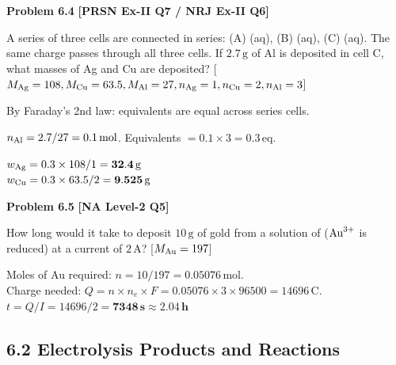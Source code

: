 \begin{problembox}
\textbf{Problem 6.4} \hfill \textbf{[PRSN Ex-II Q7 / NRJ Ex-II Q6]}

A series of three cells are connected in series: (A) (aq), (B) (aq), (C) (aq). The same charge passes through all three cells. If $2.7\,\text{g}$ of Al is deposited in cell C, what masses of Ag and Cu are deposited?
[$M_{\ce{Ag}}=108, M_{\ce{Cu}}=63.5, M_{\ce{Al}}=27, n_{\ce{Ag}}=1, n_{\ce{Cu}}=2, n_{\ce{Al}}=3$]
\end{problembox}
\begin{solution}
By Faraday's 2nd law: equivalents are equal across series cells.

$n_{\ce{Al}} = 2.7/27 = 0.1\,\text{mol}$. Equivalents $= 0.1 \times 3 = 0.3\,\text{eq}$.

$w_{\ce{Ag}} = 0.3 \times 108/1 = \mathbf{32.4\,\text{g}}$\\
$w_{\ce{Cu}} = 0.3 \times 63.5/2 = \mathbf{9.525\,\text{g}}$
\end{solution}

\begin{problembox}
\textbf{Problem 6.5} \hfill \textbf{[NA Level-2 Q5]}

How long would it take to deposit $10\,\text{g}$ of gold from a solution of  ($\ce{Au^3+}$ is reduced) at a current of $2\,\text{A}$? [$M_{\ce{Au}}=197$]
\end{problembox}
\begin{solution}
Moles of Au required: $n = 10/197 = 0.05076\,\text{mol}$.\\
Charge needed: $Q = n \times n_e \times F = 0.05076 \times 3 \times 96500 = 14696\,\text{C}$.\\
$t = Q/I = 14696/2 = \mathbf{7348\,\text{s} \approx 2.04\,\text{h}}$
\end{solution}

\subsection{6.2 Electrolysis Products and Reactions}

